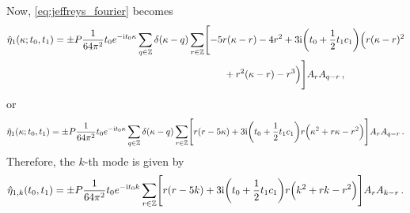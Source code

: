 \documentclass{jfm}
\newcommand{\im}{\mathrm{i}}
\begin{document}
Now, \cref{eq:jeffreys_fourier} becomes
\begin{equation}
\begin{aligned}
  \hat{\eta}_1(\kappa;t_0,t_1) = \pm P \frac{1}{64\pi^2} t_0 e^{-\im t_0
    \kappa} \sum_{q\in\mathbb{Z}} \delta(\kappa-q) \sum_{r\in\mathbb{Z}} & \Biggl[
    -5 r (\kappa-r)
    -4 r^2
    + 3 \im \pqty{t_0 + \frac{1}{2} t_1 c_1} \Bigl(
      r (\kappa-r)^2 \\
    &\qquad
    + r^2 (\kappa-r)
    - r^3 \Bigr) \Biggr] A_r A_{q-r} \,,
\end{aligned}
\end{equation}
or
\begin{equation*}
  \hat{\eta}_1(\kappa;t_0,t_1) = \pm P \frac{1}{64\pi^2} t_0 e^{-\im t_0
    \kappa} \sum_{q\in\mathbb{Z}} \delta(\kappa-q) \sum_{r\in\mathbb{Z}} \Biggl[
    r( r-5 \kappa)
    + 3 \im \pqty{t_0 + \frac{1}{2} t_1 c_1} r \Bigl(
      \kappa^2 + r \kappa - r^2 \Bigr) \Biggr] A_r A_{q-r} \,.
\end{equation*}
Therefore, the $k$-th mode is given by
\[
  \hat{\eta}_{1,k}(t_0,t_1) = \pm P \frac{1}{64\pi^2} t_0 e^{-\im t_0 k}
    \sum_{r\in\mathbb{Z}} \Biggl[ r( r-5k)
    + 3 \im \pqty{t_0 + \frac{1}{2} t_1 c_1} r \Bigl(
      k^2 + r k - r^2 \Bigr) \Biggr] A_r A_{k-r} \,.
\]
\end{document}
